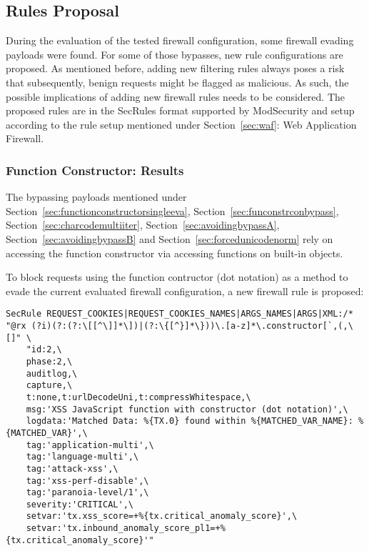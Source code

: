 \subsection{Rules Proposal}
\label{sec:rulesproposal}
During the evaluation of the tested firewall configuration, some firewall evading payloads were found. For some of those bypasses, new rule configurations are proposed. As mentioned before, adding new filtering rules always poses a risk that subsequently, benign requests might be flagged as malicious. As such, the possible implications of adding new firewall rules needs to be considered.
The proposed rules are in the SecRules format supported by ModSecurity and setup according to the rule setup mentioned under Section~\ref{sec:waf}: Web Application Firewall.

\subsubsection{Function Constructor: Results}
\label{sec:rulespropfunctionconstructor}
The bypassing payloads mentioned under Section~\ref{sec:functionconstructorsingleeva}, Section~\ref{sec:funconstrconbypass}, Section~\ref{sec:charcodemultiiter}, Section~\ref{sec:avoidingbypassA}, Section~\ref{sec:avoidingbypassB} and Section~\ref{sec:forcedunicodenorm} rely on accessing the function constructor via accessing functions on built-in objects.

To block requests using the function contructor (dot notation) as a method to evade the current evaluated firewall configuration, a new firewall rule is proposed:

\begin{lstlisting}[style=basicStyle, caption=rule proposal to block usage of Function() constructor in dot notation, label={lst:constructorsruleproposal}]
SecRule REQUEST_COOKIES|REQUEST_COOKIES_NAMES|ARGS_NAMES|ARGS|XML:/* "@rx (?i)(?:(?:\[[^\]]*\])|(?:\{[^}]*\}))\.[a-z]*\.constructor[`,(,\[]" \
    "id:2,\
    phase:2,\
    auditlog,\
    capture,\
    t:none,t:urlDecodeUni,t:compressWhitespace,\
    msg:'XSS JavaScript function with constructor (dot notation)',\
    logdata:'Matched Data: %{TX.0} found within %{MATCHED_VAR_NAME}: %{MATCHED_VAR}',\
    tag:'application-multi',\
    tag:'language-multi',\
    tag:'attack-xss',\
    tag:'xss-perf-disable',\
    tag:'paranoia-level/1',\
    severity:'CRITICAL',\
    setvar:'tx.xss_score=+%{tx.critical_anomaly_score}',\
    setvar:'tx.inbound_anomaly_score_pl1=+%{tx.critical_anomaly_score}'"
\end{lstlisting}

